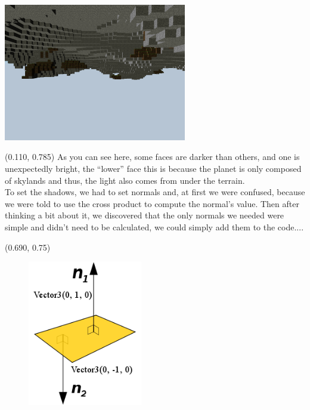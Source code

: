 \documentclass[article]{report}             %
\begin{document}
				\begin{center}
					\includegraphics[width=8cm]{images/shadows.png} %
				\end{center}
					\begin{textblock}{0.575}(0.110, 0.785)
					As you can see here, some faces are darker than others, and one is unexpectedly bright, the ``lower'' face this is because the planet is only composed of skylands and thus, the light also comes from under the terrain.\\

					To set the shadows, we had to set normals and, at first we were confused, because we were told to use the cross product to compute the normal's value. Then after thinking a bit about it, we discovered that the only normals we needed were simple and didn't need to be calculated, we could simply add them to the code....
				\end{textblock}

				\begin{textblock}{0.628}(0.690, 0.75)
					\begin{figure}
					\includegraphics[width=5cm]{images/normal.png}
					\end{figure}
				\end{textblock}
\newpage
\end{document}
